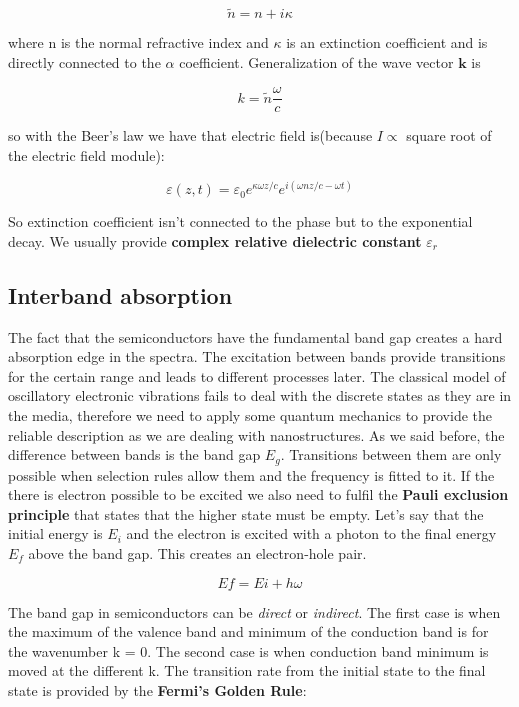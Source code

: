 \begin{equation}
\tilde{n} = n + i\kappa
\end{equation}

where n is the normal refractive index and $\kappa$ is an extinction coefficient and is directly connected to the $\alpha$ coefficient. Generalization of the wave vector $\mathbf{k}$ is 

\begin{equation}
k = \tilde{n} \frac{\omega}{c}
\end{equation}

so with the Beer's law we have that electric field is(because $I \propto$ square root of the electric field module):

\begin{equation}
\varepsilon (z,t) = \varepsilon _0 e^{\kappa \omega z/c} e^{i(\omega nz/c - \omega t)}
\end{equation}

So extinction coefficient isn't connected to the phase but to the exponential decay. We usually provide \textbf{complex relative dielectric constant} $\varepsilon _r$

\subsection{Interband absorption}
The fact that the semiconductors have the fundamental band gap creates a hard absorption edge in the spectra. The excitation between bands provide transitions for the certain range and leads to different processes later. The classical model of oscillatory electronic vibrations fails to deal with the discrete states as they are in the media, therefore we need to apply some quantum mechanics to provide the reliable description as we are dealing with nanostructures. As we said before, the difference between bands is the band gap $E_g$. Transitions between them are only possible when selection rules allow them and the frequency is fitted to it. If the there is electron possible to be excited we also need to fulfil the \textbf{Pauli exclusion principle} that states that the higher state must be empty. Let's say that the initial energy is $E_i$ and the electron is excited with a photon to the final energy $E_f$ above the band gap. This creates an electron-hole pair. 

\begin{equation}
Ef=Ei + h\omega
\end{equation} 

The band gap in semiconductors can be \textit{direct} or \textit{indirect}. The first case is when the maximum of the valence band and minimum of the conduction band is for the wavenumber k = 0. The second case is when conduction band minimum is moved at the different k. The transition rate from the initial state to the final state is provided by the \textbf{Fermi's Golden Rule}:


